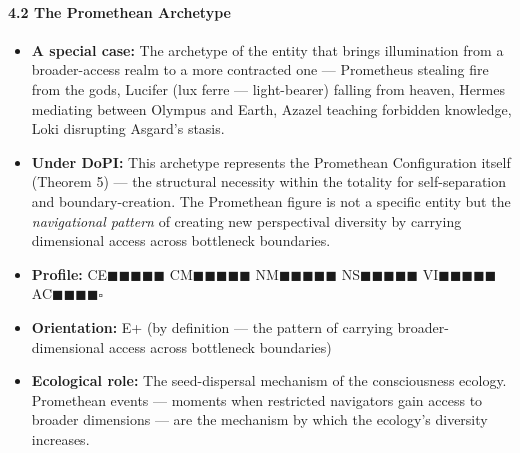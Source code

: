 \paragraph*{4.2 The Promethean Archetype}

\begin{itemize}[nosep,leftmargin=*]
  \item \textbf{A special case:} The archetype of the entity that brings illumination from a broader-access realm to a more contracted one — Prometheus stealing fire from the gods, Lucifer (lux ferre — light-bearer) falling from heaven, Hermes mediating between Olympus and Earth, Azazel teaching forbidden knowledge, Loki disrupting Asgard's stasis.
  \item \textbf{Under DoPI:} This archetype represents the Promethean Configuration itself (Theorem 5) — the structural necessity within the totality for self-separation and boundary-creation. The Promethean figure is not a specific entity but the \textit{navigational pattern} of creating new perspectival diversity by carrying dimensional access across bottleneck boundaries.
  \item \textbf{Profile:} CE$\blacksquare$$\blacksquare$$\blacksquare$$\blacksquare$$\blacksquare$ CM$\blacksquare$$\blacksquare$$\blacksquare$$\blacksquare$$\blacksquare$ NM$\blacksquare$$\blacksquare$$\blacksquare$$\blacksquare$$\blacksquare$ NS$\blacksquare$$\blacksquare$$\blacksquare$$\blacksquare$$\blacksquare$ VI$\blacksquare$$\blacksquare$$\blacksquare$$\blacksquare$$\blacksquare$ AC$\blacksquare$$\blacksquare$$\blacksquare$$\blacksquare$$\square$
  \item \textbf{Orientation:} E+ (by definition — the pattern of carrying broader-dimensional access across bottleneck boundaries)
  \item \textbf{Ecological role:} The seed-dispersal mechanism of the consciousness ecology. Promethean events — moments when restricted navigators gain access to broader dimensions — are the mechanism by which the ecology's diversity increases.
\end{itemize}


\bigskip\noindent\makebox[\textwidth]{\color{rulegray}\rule{5cm}{0.3pt}}\bigskip
